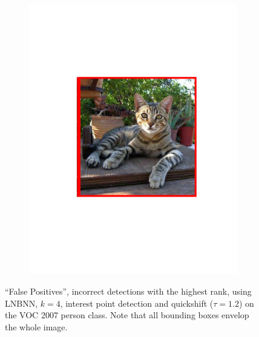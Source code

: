 \begin{figure}[hbt]
\begin{subfigure}[b]{0.45\textwidth}
        \includegraphics[width=\textwidth]{FP4}
        \caption{}
        \label{fig:detfp4}
    \end{subfigure}
    \caption{``False Positives'', incorrect detections with the highest rank, using LNBNN, $k=4$, interest point detection and quickshift ($\tau=1.2$) on the VOC 2007 person class. Note that all bounding boxes envelop the whole image.}
    \label{fig:detfp}
\end{figure}

